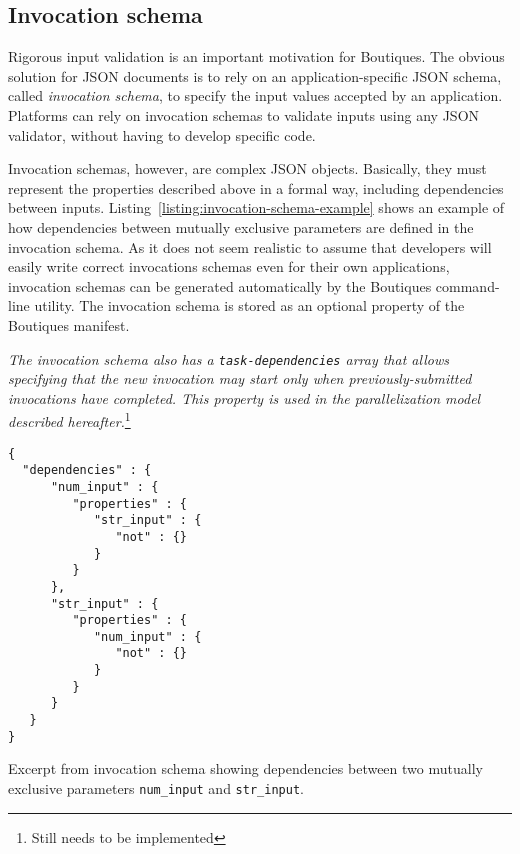 \documentclass{article}
\newcommand{\boutiques}{Boutiques\xspace}
\newcommand{\notimplementedyet}[1]{\color{blue}\emph{#1}\footnote{Still needs to be implemented}\color{black}\xspace}
\begin{document}
\subsection{Invocation schema}
\label{sec:invocation-schema}

Rigorous input validation is an important motivation for
\boutiques. The obvious solution for JSON documents is to rely on an
application-specific JSON schema, called \emph{invocation schema}, to
specify the input values accepted by an application. Platforms can
rely on invocation schemas to validate inputs using
any JSON validator, without having to develop specific code.

Invocation schemas, however, are complex JSON objects. Basically, they
must represent the properties described above in a formal way,
including dependencies between
inputs. Listing~\ref{listing:invocation-schema-example} shows an
example of how dependencies between mutually exclusive parameters are
defined in the invocation schema. As it does not seem realistic to
assume that developers will easily write correct invocations schemas
even for their own applications, invocation schemas can be generated
automatically by the \boutiques command-line utility. The invocation
schema is stored as an optional property of the \boutiques manifest.

\notimplementedyet{The invocation schema also has a
  \texttt{task-dependencies} array that allows specifying that the new
  invocation may start only when previously-submitted invocations have
  completed. This property is used in the parallelization model
  described hereafter.}

\begin{listing}
\begin{verbatim}
{
  "dependencies" : {
      "num_input" : {
         "properties" : {
            "str_input" : {
               "not" : {}
            }
         }
      },
      "str_input" : {
         "properties" : {
            "num_input" : {
               "not" : {}
            }
         }
      }
   }
}
\end{verbatim}
\caption{Excerpt from invocation schema showing dependencies between
  two mutually exclusive parameters \texttt{num\_input} and
  \texttt{str\_input}.}
\label{listing:invocation-schema-example}
\end{listing}
\end{document}
